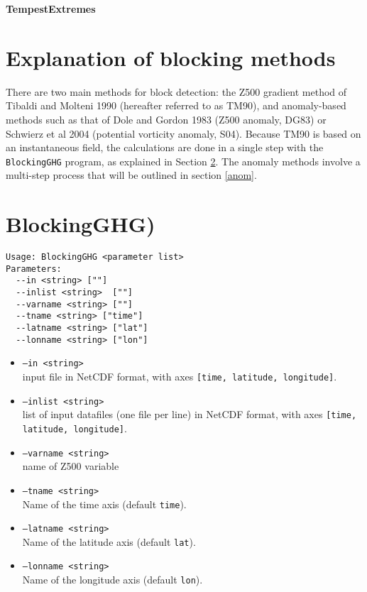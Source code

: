 \documentclass{article}
\begin{document}
{\Huge \textbf{TempestExtremes}}


\section{Explanation of blocking methods}

There are two main methods for block detection: the Z500 gradient method of Tibaldi and Molteni 1990 (hereafter referred to as TM90), and anomaly-based methods such as that of Dole and Gordon 1983 (Z500 anomaly, DG83) or Schwierz et al 2004 (potential vorticity anomaly, S04). Because TM90 is based on an instantaneous field, the calculations are done in a single step with the \texttt{BlockingGHG} program, as explained in Section \ref{ghg}. The anomaly methods involve a multi-step process that will be outlined in section \ref{anom}.

\section{BlockingGHG)}\label{ghg}

\begin{verbatim}
Usage: BlockingGHG <parameter list>
Parameters:
  --in <string> [""]
  --inlist <string>  [""]
  --varname <string> [""]
  --tname <string> ["time"]
  --latname <string> ["lat"]
  --lonname <string> ["lon"]
\end{verbatim}

\begin{itemize}
\item[]\texttt{--in <string>} \\ input file in NetCDF format, with axes \texttt{[time, latitude, longitude]}. 
\item[]\texttt{--inlist <string>}\\ list of input datafiles (one file per line) in NetCDF format, with axes \texttt{[time, latitude, longitude]}. 
\item[] \texttt{--varname <string>}\\ name of Z500 variable
\item[] \texttt{--tname <string>}\\Name of the time axis (default \texttt{time}).
\item[]\texttt{--latname <string>}\\Name of the latitude axis (default \texttt{lat}).
\item[]\texttt{--lonname <string>}\\Name of the longitude axis (default \texttt{lon}).
\end{itemize}
\end{document}
